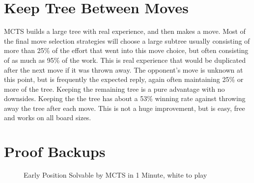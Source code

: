 \section{Keep Tree Between Moves}

MCTS builds a large tree with real experience, and then makes a move. Most of the final move selection strategies will choose a large subtree usually consisting of more than 25\% of the effort that went into this move choice, but often consisting of as much as 95\% of the work. This is real experience that would be duplicated after the next move if it was thrown away. The opponent's move is unknown at this point, but is frequently the expected reply, again often maintaining 25\% or more of the tree. Keeping the remaining tree is a pure advantage with no downsides. Keeping the the tree has about a 53\% winning rate against throwing away the tree after each move. This is not a huge improvement, but is easy, free and works on all board sizes.



\section{Proof Backups}\label{sec:proofbackups}

\begin{figure}
	\centering
	\begin{HavannahBoard}[board size=4,coordinate style=classical,show coordinates=false]
	\end{HavannahBoard}
	\caption{Early Position Solvable by MCTS in 1 Minute, white to play}
	\label{fig:lorentzproof}
\end{figure}

